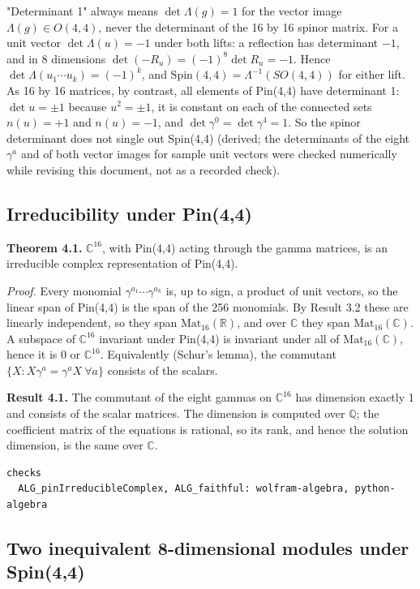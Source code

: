 \documentclass[11pt]{article}
\begin{document}
"Determinant 1" always means $\det\Lambda(g)=1$ for the vector image $\Lambda(g)\in O(4,4)$, never the determinant of the 16 by 16 spinor matrix. For a unit vector $\det\Lambda(u)=-1$ under both lifts: a reflection has determinant $-1$, and in 8 dimensions $\det(-R_u)=(-1)^8\det R_u=-1$. Hence $\det\Lambda(u_1\cdots u_k)=(-1)^k$, and $\mathrm{Spin}(4,4)=\Lambda^{-1}(SO(4,4))$ for either lift. As 16 by 16 matrices, by contrast, all elements of Pin(4,4) have determinant 1: $\det u=\pm1$ because $u^2=\pm1$, it is constant on each of the connected sets $n(u)=+1$ and $n(u)=-1$, and $\det\gamma^0=\det\gamma^4=1$. So the spinor determinant does not single out Spin(4,4) (derived; the determinants of the eight $\gamma^a$ and of both vector images for sample unit vectors were checked numerically while revising this document, not as a recorded check).

\subsection{Irreducibility under Pin(4,4)}

\textbf{Theorem 4.1.} $\mathbb C^{16}$, with Pin(4,4) acting through the gamma matrices, is an irreducible complex representation of Pin(4,4).

\emph{Proof.} Every monomial $\gamma^{a_1}\cdots\gamma^{a_k}$ is, up to sign, a product of unit vectors, so the linear span of Pin(4,4) is the span of the 256 monomials. By Result 3.2 these are linearly independent, so they span $\mathrm{Mat}_{16}(\mathbb R)$, and over $\mathbb C$ they span $\mathrm{Mat}_{16}(\mathbb C)$. A subspace of $\mathbb C^{16}$ invariant under Pin(4,4) is invariant under all of $\mathrm{Mat}_{16}(\mathbb C)$, hence it is $0$ or $\mathbb C^{16}$. Equivalently (Schur's lemma), the commutant $\{X:X\gamma^a=\gamma^aX\ \forall a\}$ consists of the scalars.

\textbf{Result 4.1.} The commutant of the eight gammas on $\mathbb C^{16}$ has dimension exactly 1 and consists of the scalar matrices. The dimension is computed over $\mathbb Q$; the coefficient matrix of the equations is rational, so its rank, and hence the solution dimension, is the same over $\mathbb C$.

\begin{Verbatim}[fontsize=\small]
checks
  ALG_pinIrreducibleComplex, ALG_faithful: wolfram-algebra, python-algebra
\end{Verbatim}

\subsection{Two inequivalent 8-dimensional modules under Spin(4,4)}
\end{document}
